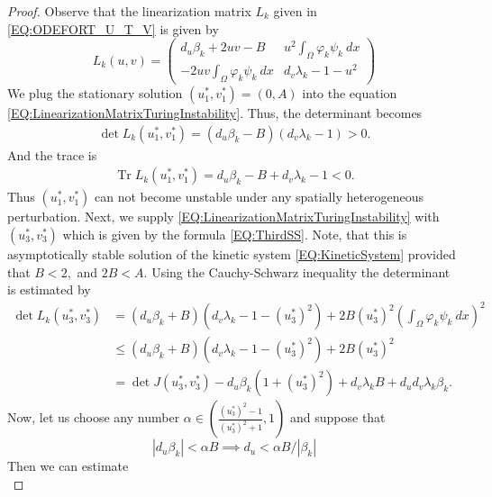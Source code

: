 \documentclass[12pt, a4paper]{article}
\theoremstyle{break}
\theoremstyle{break}
\theoremstyle{break}
\theoremstyle{break}
\theoremstyle{break}
\theoremstyle{break}
\theoremstyle{break}
\DeclareMathOperator{\Tr}{Tr}
\begin{document}
\begin{proof}
    Observe that the linearization matrix $L_k$ given in \eqref{EQ:ODEFORT_U_T_V} is given by
    \begin{equation}
        \label{EQ:LinearizationMatrixTuringInstability}
        L_k(u, v) 
        = 
        \begin{pmatrix}
            d_u \beta_k + 2 u v - B & u^2 \int_\Omega \varphi_k \psi_k \:dx \\ -2u v \int_\Omega \varphi_k \psi_k \:dx & d_v\lambda_k -1-u^2
        \end{pmatrix}
    \end{equation}
    We plug the stationary solution $(u_1^*, v_1^*) = (0, A)$ into the equation \eqref{EQ:LinearizationMatrixTuringInstability}. Thus, the determinant becomes
    \begin{align*}
        \det L_k(u_1^*, v_1^*) = (d_u \beta_k - B) (d_v \lambda_k - 1) > 0.
    \end{align*}
    And the trace is
    \begin{align*}
        \Tr L_k(u_1^*, v_1^*) = d_u \beta_k - B + d_v \lambda_k - 1 < 0.
    \end{align*}
    Thus $(u_1^*, v_1^*)$ can not become unstable under any spatially heterogeneous perturbation. Next, we supply \eqref{EQ:LinearizationMatrixTuringInstability} with $(u_3^*, v_3^*)$ which is given by the formula \eqref{EQ:ThirdSS}. Note, that this is asymptotically stable solution of the kinetic system \eqref{EQ:KineticSystem} provided that $B < 2,$ and $ 2 B < A$. Using the Cauchy-Schwarz inequality the determinant is estimated by
    \begin{align*}
        \det L_k(u_3^*, v_3^*) 
        &= (d_u \beta_k + B) (d_v \lambda_k - 1 - (u_3^*)^2) + 2 B (u_3^*)^2 \left(\int_\Omega \varphi_k \psi_k \:dx\right)^2 \\
        &\leq (d_u \beta_k + B) (d_v \lambda_k - 1 - (u_3^*)^2) + 2 B (u_3^*)^2 \\
        &= \det J(u_3^*, v_3^*) - d_u \beta_k (1 + (u_3^*)^2 ) + d_v \lambda_k B + d_u d_v \lambda_k \beta_k.
    \end{align*}
    Now, let us choose any number $\alpha \in \left(\frac{(u_3^*)^2 - 1}{(u_3^*)^2 + 1}, 1\right)$ and suppose that
    \begin{equation*}
        |d_u \beta_k| < \alpha B \implies d_u < \alpha B / |\beta_k|
    \end{equation*}
    Then we can estimate
    \begin{equation*}

\end{equation*}
\end{proof}
\end{document}
